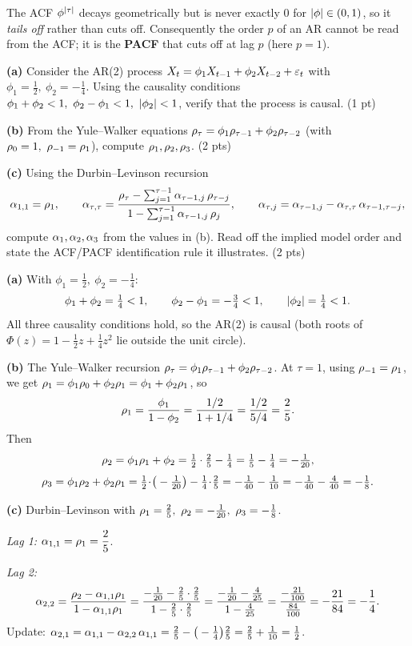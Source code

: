 \documentclass[11pt]{article}
\begin{document}
The ACF $\phi^{\left\lvert \tau \right\rvert}$ decays geometrically but is never exactly $0$ for $\left\lvert \phi \right\rvert\in(0,1)$, so it \emph{tails off} rather than cuts off. Consequently the order $p$ of an AR cannot be read from the ACF; it is the \textbf{PACF} that cuts off at lag $p$ (here $p=1$).

\statementstart
\textbf{(a)} Consider the AR(2) process $X_t=\phi_1 X_{t-1}+\phi_2 X_{t-2}+\varepsilon_t$ with $\phi_1=\tfrac12,\ \phi_2=-\tfrac14$. Using the causality conditions $\phi_1+\phi_2<1,\ \phi_2-\phi_1<1,\ \abs{\phi_2}<1$, verify that the process is causal. \hfill(1 pt)

\textbf{(b)} From the Yule--Walker equations $\rho_\tau=\phi_1\rho_{\tau-1}+\phi_2\rho_{\tau-2}$ (with $\rho_0=1,\ \rho_{-1}=\rho_1$), compute $\rho_1,\rho_2,\rho_3$. \hfill(2 pts)

\textbf{(c)} Using the Durbin--Levinson recursion
\[
\alpha_{1,1}=\rho_1,\qquad
\alpha_{\tau,\tau}=\frac{\rho_\tau-\sum_{j=1}^{\tau-1}\alpha_{\tau-1,j}\,\rho_{\tau-j}}{1-\sum_{j=1}^{\tau-1}\alpha_{\tau-1,j}\,\rho_{j}},
\qquad
\alpha_{\tau,j}=\alpha_{\tau-1,j}-\alpha_{\tau,\tau}\,\alpha_{\tau-1,\tau-j},
\]
compute $\alpha_1,\alpha_2,\alpha_3$ from the values in (b). Read off the implied model order and state the ACF/PACF identification rule it illustrates. \hfill(2 pts)
\statementend

\textbf{(a)} With $\phi_1=\tfrac12,\ \phi_2=-\tfrac14$:
\[
\phi_1+\phi_2=\tfrac14<1,\qquad
\phi_2-\phi_1=-\tfrac34<1,\qquad
\left\lvert \phi_2 \right\rvert=\tfrac14<1.
\]
All three causality conditions hold, so the AR(2) is causal (both roots of $\Phi(z)=1-\tfrac12 z+\tfrac14 z^2$ lie outside the unit circle).

\textbf{(b)} The Yule--Walker recursion $\rho_\tau=\phi_1\rho_{\tau-1}+\phi_2\rho_{\tau-2}$. At $\tau=1$, using $\rho_{-1}=\rho_1$, we get $\rho_1=\phi_1\rho_0+\phi_2\rho_1=\phi_1+\phi_2\rho_1$, so
\[
\rho_1=\frac{\phi_1}{1-\phi_2}=\frac{1/2}{1+1/4}=\frac{1/2}{5/4}=\frac25.
\]
Then
\[
\rho_2=\phi_1\rho_1+\phi_2=\tfrac12\cdot\tfrac25-\tfrac14=\tfrac15-\tfrac14=-\tfrac1{20},
\]
\[
\rho_3=\phi_1\rho_2+\phi_2\rho_1
=\tfrac12\!\cdot\!\big(-\tfrac1{20}\big)-\tfrac14\!\cdot\!\tfrac25
=-\tfrac1{40}-\tfrac1{10}=-\tfrac1{40}-\tfrac4{40}=-\tfrac18.
\]

\textbf{(c)} Durbin--Levinson with $\acf_1=\tfrac25,\ \acf_2=-\tfrac1{20},\ \acf_3=-\tfrac18$.

\emph{Lag 1:} $\alpha_{1,1}=\rho_1=\dfrac25$.

\emph{Lag 2:}
\[
\alpha_{2,2}=\frac{\rho_2-\alpha_{1,1}\rho_1}{1-\alpha_{1,1}\rho_1}
=\frac{-\frac1{20}-\frac25\cdot\frac25}{1-\frac25\cdot\frac25}
=\frac{-\frac1{20}-\frac4{25}}{1-\frac4{25}}
=\frac{-\frac{21}{100}}{\frac{84}{100}}
=-\frac{21}{84}=-\frac14.
\]
Update: $\alpha_{2,1}=\alpha_{1,1}-\alpha_{2,2}\,\alpha_{1,1}=\tfrac25-\big(-\tfrac14\big)\tfrac25=\tfrac25+\tfrac1{10}=\tfrac12$.
\end{document}
